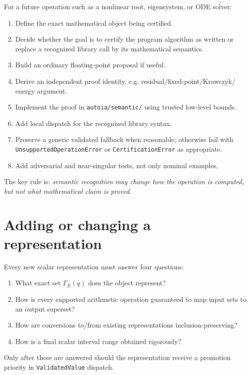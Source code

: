 \documentclass[11pt]{article}
\newcommand{\codepath}[1]{\nolinkurl{#1}}
\begin{document}
For a future operation such as a nonlinear root, eigensystem, or ODE solver:
\begin{enumerate}[leftmargin=*]
\item Define the exact mathematical object being certified.
\item Decide whether the goal is to certify the program algorithm as written or
replace a recognized library call by its mathematical semantics.
\item Build an ordinary floating-point proposal if useful.
\item Derive an independent proof identity, e.g. residual/fixed-point/Krawczyk/
energy argument.
\item Implement the proof in \codepath{autoia/semantic/} using trusted low-level
bounds.
\item Add local dispatch for the recognized library syntax.
\item Preserve a generic validated fallback when reasonable; otherwise fail with
\texttt{UnsupportedOperationError} or \texttt{CertificationError} as appropriate.
\item Add adversarial and near-singular tests, not only nominal examples.
\end{enumerate}

The key rule is: \emph{semantic recognition may change how the operation is
computed, but not what mathematical claim is proved}.

\section{Adding or changing a representation}

Every new scalar representation must answer four questions:
\begin{enumerate}[leftmargin=*]
\item What exact set \(\Gamma_E(q)\) does the object represent?
\item How is every supported arithmetic operation guaranteed to map input sets to
an output superset?
\item How are conversions to/from existing representations inclusion-preserving?
\item How is a final scalar interval range obtained rigorously?
\end{enumerate}

Only after these are answered should the representation receive a promotion
priority in \texttt{ValidatedValue} dispatch.
\end{document}
